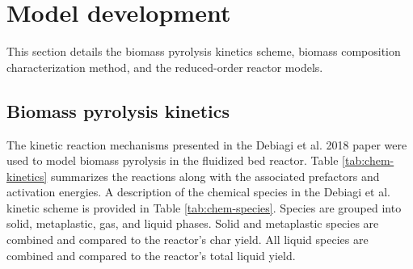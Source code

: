 \documentclass[12pt,titlepage]{article}
\begin{document}
\section{Model development}

This section details the biomass pyrolysis kinetics scheme, biomass composition characterization method, and the reduced-order reactor models.

\subsection{Biomass pyrolysis kinetics}

The kinetic reaction mechanisms presented in the Debiagi et al. 2018 paper \cite{Debiagi-2018} were used to model biomass pyrolysis in the fluidized bed reactor. Table \ref{tab:chem-kinetics} summarizes the reactions along with the associated prefactors and activation energies. A description of the chemical species in the Debiagi et al. kinetic scheme is provided in Table \ref{tab:chem-species}. Species are grouped into solid, metaplastic, gas, and liquid phases. Solid and metaplastic species are combined and compared to the reactor's char yield. All liquid species are combined and compared to the reactor's total liquid yield.
\end{document}
